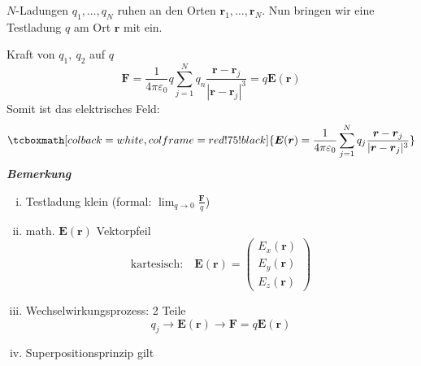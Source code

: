 \documentclass[titlepage,11pt,a4paper,ngerman]{report}
\newcommand{\tx}[1]{\textrm{#1}}
\newcommand{\summ}[2]{\sum_{#1}^{#2}}
\renewcommand{\vec}[1]{\boldsymbol{#1}}
\renewcommand{\epsilon}{\varepsilon}
\newcommand{\rmbox}[1]{\tcboxmath[colback=white,colframe=red!75!black]{#1}}
\begin{document}
\begin{minipage}{.5\linewidth}
	$N$-Ladungen $q_1, \dots, q_N$ ruhen an den Orten $\vec{r}_1, \dots, \vec{r}_N$. Nun bringen wir eine Testladung $q$ am Ort $\vec{r}$ mit ein. 
\end{minipage}
\begin{minipage}{.5\linewidth}
	
	
	\hspace{50pt}
\end{minipage}
Kraft von $q_1,\ q_2$ auf $q$
$$\vec{F} = \frac{1}{4\pi \epsilon_0} q \summ{j = 1}{N} q_n \frac{\vec{r} - \vec{r}_j}{|\vec{r} - \vec{r}_j|^3} = q \vec{E}(\vec{r})$$
Somit ist das elektrisches Feld:
$$\rmbox{\vec{E}(\vec{r}) = \frac{1}{4 \pi \epsilon_0} \summ{j = 1}{N} q_j \frac{\vec{r} - \vec{r}_j}{|\vec{r} - \vec{r}_j|^3}}$$
\textbf{\emph{Bemerkung}}
\begin{enumerate}[i)]
	\item Testladung klein (formal: $ \lim_{q\to0}\frac{\vec{F}}{q} $)
	\item math. $ \vec{E}(\vec{r}) $ Vektorpfeil\\
	\begin{equation*}
	\tx{kartesisch:} \quad \vec{E}(\vec{r}) = \begin{pmatrix}
	E_x(\vec{r}) \\ E_y(\vec{r}) \\ E_z(\vec{r})
	\end{pmatrix}
	\end{equation*}
	\item Wechselwirkungsprozess: 2 Teile
	\begin{equation*}
	q_j \rightarrow \vec{E}(\vec{r}) \rightarrow \vec{F} = q \vec{E} (\vec{r})
	\end{equation*}
	\item Superpositionsprinzip gilt
\end{enumerate}
\end{document}

